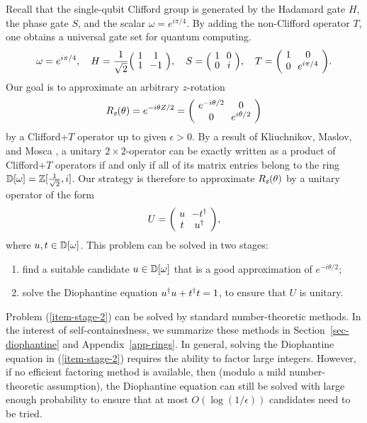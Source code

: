 \documentclass{article}
\begin{document}
Recall that the single-qubit Clifford group is generated by the
Hadamard gate $H$, the phase gate $S$, and the scalar
$\omega=e^{i\pi/4}$. By adding the non-Clifford operator $T$, one
obtains a universal gate set for quantum computing.
\[ 
  \omega = e^{i\pi/4}, \quad
  H = \frac{1}{\sqrt2}\zmatrix{cc}{1&1\\1&-1}, \quad
  S = \zmatrix{cc}{1&0\\0&i}, \quad
  T = \zmatrix{cc}{1&0\\0&e^{i\pi/4}}.
\]
Our goal is to approximate an arbitrary $z$-rotation 
\[ \Rz(\theta) = e^{-i\theta Z/2} = \zmatrix{cc}{e^{-i\theta/2} & 0 \\
  0 & e^{i\theta/2}}
\]
by a Clifford+$T$ operator up to given $\epsilon>0$. By a result of
Kliuchnikov, Maslov, and Mosca {\cite{Kliuchnikov-etal}}, a unitary
$2\times 2$-operator can be exactly written as a product of
Clifford+$T$ operators if and only if all of its matrix entries belong to
the ring ${\mathbb{D}}[\omega] = \mathbb{Z}[\frac{1}{\sqrt2},i]$. Our strategy is therefore
to approximate $R_{\textsl{z}}(\theta)$ by a unitary operator of the form
\[ U = \zmatrix{cc}{u & -t\da \\ t & u\da},
\]
where $u,t\in{\mathbb{D}}[\omega]$. This problem can be solved in two stages:
\begin{enumerate}\roundlabels
\item\label{item-stage-1} find a suitable candidate $u\in{\mathbb{D}}[\omega]$ that is a good
  approximation of $e^{-i\theta/2}$;
\item\label{item-stage-2} solve the Diophantine
  equation $u^{\dagger} u+t^{\dagger} t=1$, to ensure that $U$ is unitary.
\end{enumerate}
Problem (\ref{item-stage-2}) can be solved by standard
number-theoretic methods. In the interest of self-containedness, we
summarize these methods in Section~\ref{sec-diophantine} and
Appendix~\ref{app-rings}. In general, solving the Diophantine equation
in (\ref{item-stage-2}) requires the ability to factor large
integers. However, if no efficient factoring method is available, then
(modulo a mild number-theoretic assumption), the Diophantine equation
can still be solved with large enough probability to ensure that at
most $O(\log(1/\epsilon))$ candidates need to be tried.
\end{document}
